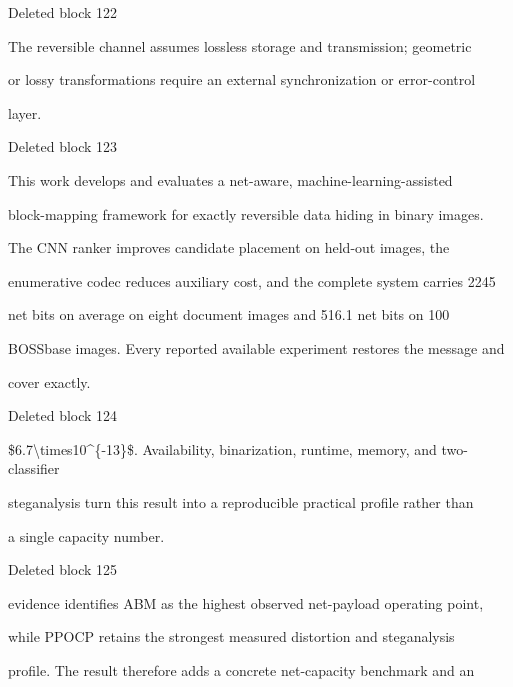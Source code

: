 \documentclass[a4paper,fleqn]{cas-dc}
\newenvironment{RevisionDeletion}{%
  \par\begingroup\color{revisionred}\footnotesize\ttfamily
  \setlength{\parindent}{0pt}\setlength{\parskip}{1pt}\obeyspaces
}{\par\endgroup}
\begin{document}
\begin{RevisionDeletion}
Deleted block 122\par
The reversible channel assumes lossless storage and transmission; geometric\par
or lossy transformations require an external synchronization or error-control\par
layer.\par
\end{RevisionDeletion}

\begin{RevisionDeletion}
Deleted block 123\par
This work develops and evaluates a net-aware, machine-learning-assisted\par
block-mapping framework for exactly reversible data hiding in binary images.\par
The CNN ranker improves candidate placement on held-out images, the\par
enumerative codec reduces auxiliary cost, and the complete system carries 2245\par
net bits on average on eight document images and 516.1 net bits on 100\par
BOSSbase images. Every reported available experiment restores the message and\par
cover exactly.\par
\end{RevisionDeletion}

\begin{RevisionDeletion}
Deleted block 124\par
\$6.7\textbackslash{}times10\textasciicircum{}\{-13\}\$. Availability, binarization, runtime, memory, and two-classifier\par
steganalysis turn this result into a reproducible practical profile rather than\par
a single capacity number.\par
\end{RevisionDeletion}

\begin{RevisionDeletion}
Deleted block 125\par
evidence identifies ABM as the highest observed net-payload operating point,\par
while PPOCP retains the strongest measured distortion and steganalysis\par
profile. The result therefore adds a concrete net-capacity benchmark and an\par
\end{RevisionDeletion}
\end{document}
